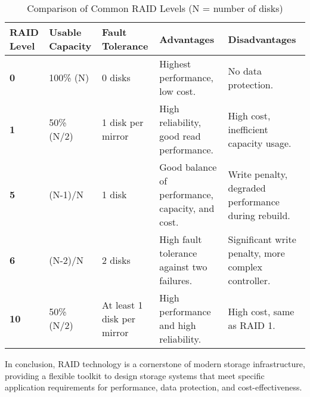 \begin{table}[h!]
    \centering
    \begin{tabular}{|p{}|p{}|p{}|p{}|p{}|}
        \hline
        \textbf{RAID Level} & \textbf{Usable Capacity} & \textbf{Fault Tolerance} & \textbf{Advantages} & \textbf{Disadvantages} \\
        \hline
        \textbf{0} & 100\% (N) & 0 disks & Highest performance, low cost. & No data protection. \\
        \hline
        \textbf{1} & 50\% (N/2) & 1 disk per mirror & High reliability, good read performance. & High cost, inefficient capacity usage. \\
        \hline
        \textbf{5} & (N-1)/N & 1 disk & Good balance of performance, capacity, and cost. & Write penalty, degraded performance during rebuild. \\
        \hline
        \textbf{6} & (N-2)/N & 2 disks & High fault tolerance against two failures. & Significant write penalty, more complex controller. \\
        \hline
        \textbf{10} & 50\% (N/2) & At least 1 disk per mirror & High performance and high reliability. & High cost, same as RAID 1. \\
        \hline
    \end{tabular}
    \caption{Comparison of Common RAID Levels (N = number of disks)}
    \label{tab:raid_comparison}
\end{table}

In conclusion, RAID technology is a cornerstone of modern storage infrastructure, providing a flexible toolkit to design storage systems that meet specific application requirements for performance, data protection, and cost-effectiveness.